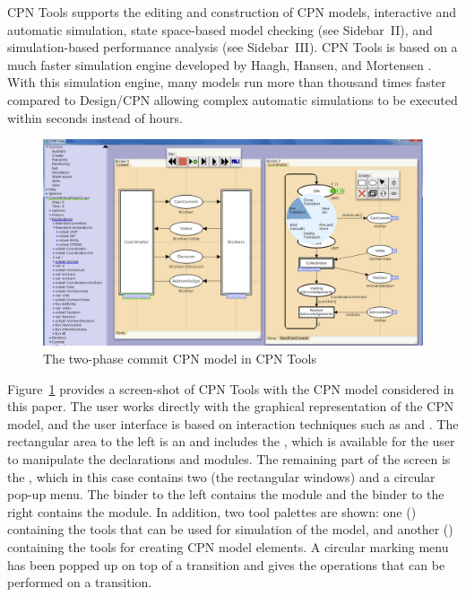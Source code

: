 CPN Tools supports the editing and construction of CPN models,
interactive and automatic simulation, state space-based model checking
(see Sidebar~II), and simulation-based performance analysis (see
Sidebar~III). CPN Tools is based on a much faster simulation engine
developed by Haagh, Hansen, and Mortensen \cite{mortensen:01}. With
this simulation engine, many models run more than thousand times
faster compared to Design/CPN allowing complex automatic simulations
to be executed within seconds instead of hours. 


\begin{figure}[t]
\centering
\includegraphics[scale=.36]{figures/cpntoolsnew.png}
\caption{The two-phase commit CPN model in CPN Tools}
\label{fig:cpntools}
\end{figure}

Figure~\ref{fig:cpntools} provides a screen-shot of CPN Tools with the
CPN model considered in this paper. The user works directly with the
graphical representation of the CPN model, and the user interface is
based on interaction techniques such as  and
. The rectangular area to the left is an
 and includes the , which is
available for the user to manipulate the declarations and modules. The
remaining part of the screen is the , which in this
case contains two  (the rectangular windows) and a
circular pop-up menu. The binder to the left contains the
 module and the binder to the right contains the
 module. In addition, two tool palettes are
shown: one () containing the tools that can be used for
simulation of the model, and another () containing the
tools for creating CPN model elements. A circular marking menu has
been popped up on top of a transition and gives the operations that
can be performed on a transition.




